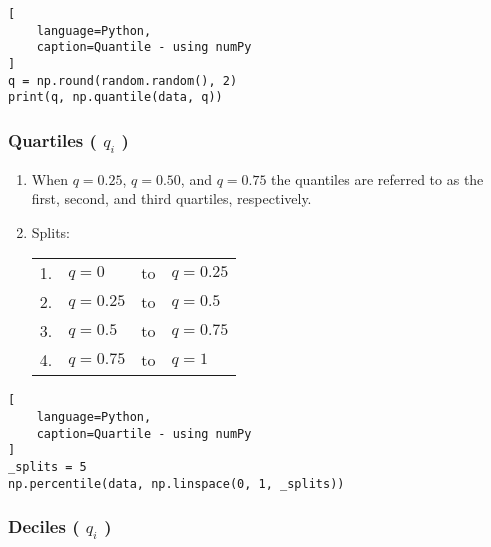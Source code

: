 \begin{lstlisting}[
    language=Python, 
    caption=Quantile - using numPy
]
q = np.round(random.random(), 2)
print(q, np.quantile(data, q))
\end{lstlisting}



\subsubsection{Quartiles ( $q_i$ ) \cite{statistics/book/Statistics-for-Data-Scientists/Maurits-Kaptein}} \label{Data/Describing Data/Central Tendency/Quartiles}

\begin{enumerate}
    \item When $q = 0.25$, $q = 0.50$, and $q = 0.75$ the quantiles are referred to as the first, second, and third quartiles, respectively. \hfill \cite{statistics/book/Statistics-for-Data-Scientists/Maurits-Kaptein}
    \label{Data/Describing Data/Central Tendency/Quartiles/first quartile}
    \label{Data/Describing Data/Central Tendency/Quartiles/second quartile}
    \label{Data/Describing Data/Central Tendency/Quartiles/third quartile}

    \item Splits: \\
    \begin{tabular}{r l l l} %
        1. & $q = 0$ & to & $q = 0.25$ \\
        2. & $q = 0.25$ & to & $q = 0.5$ \\
        3. & $q = 0.5$ & to & $q = 0.75$ \\
        4. & $q = 0.75$ & to & $q = 1$ \\
    \end{tabular}
\end{enumerate}

\begin{lstlisting}[
    language=Python, 
    caption=Quartile - using numPy
]
_splits = 5
np.percentile(data, np.linspace(0, 1, _splits))
\end{lstlisting}


\subsubsection{Deciles ( $q_i$ ) \cite{statistics/book/Statistics-for-Data-Scientists/Maurits-Kaptein}} \label{Data/Describing Data/Central Tendency/Deciles}

